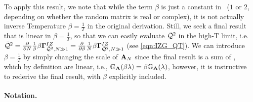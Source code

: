 To apply this result, we note that
while the term $\beta$ is just a constant in~\cite{Tanaka2008}
($1$ or $2$, depending on whether the random matrix is real or complex),
it is not actually inverse Temperature $\beta=\tfrac{1}{T}$ in the original derivation.
Still, we seek a final result that is linear in $\beta=\tfrac{1}{T}$,
so that we can easily evaluate $\bar{\mathcal{Q}}^{2}$ in the high-T limit, i.e.
$\bar{\mathcal{Q}}^{2}
=\tfrac{\partial}{\partial N}\tfrac{1}{\beta}\beta\mathbf{\Gamma}^{IZ}_{\bar{\mathcal{Q}}^{2},N\gg 1}
=\tfrac{\partial}{\partial \beta}\tfrac{1}{N}\beta\mathbf{\Gamma}^{IZ}_{\bar{\mathcal{Q}}^{2},N\gg 1}$
(see \ref{eqn:IZG_QT}).
We can introduce $\beta=\tfrac{1}{T}$ by
simply changing the scale of $\mathbf{A}_N$ since the final result is a sum of \RTransforms, which by definition
are linear, i.e., $\mathbb{G}_{\mathbf{A}}(\beta\lambda)=\beta \mathbb{G}_{\mathbf{A}}(\lambda)$, however, it is instructive
to rederive the final result, with $\beta$ explicitly included.


\paragraph{Notation.}

